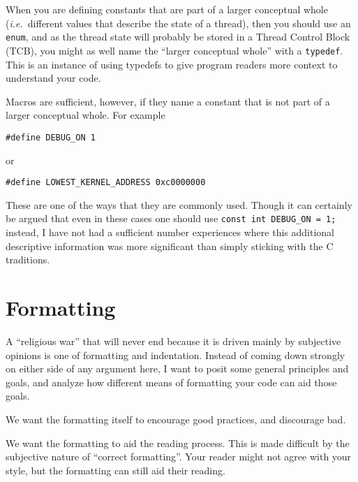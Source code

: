 \documentclass[11pt,onecolumn]{article}
\def\ie{\textit{i.e.}}
\newcommand{\head}[1]{\vspace{0.4em}\noindent{\bf #1}}
\begin{document}
When you are defining constants that are part of a larger conceptual
whole (\ie\ different values that describe the state of a thread),
then you should use an {\tt enum}, and as the thread state will
probably be stored in a Thread Control Block (TCB), you might as well
name the ``larger conceptual whole'' with a {\tt typedef}.  This is an
instance of using typedefs to give program readers more context to
understand your code.

Macros are sufficient, however, if they name a constant that is not
part of a larger conceptual whole.  For example

    \begin{minipage}{3in}
      \footnotesize
      \lstset{language=C}
      \begin{lstlisting}
#define DEBUG_ON 1
      \end{lstlisting}
    \end{minipage}

or

    \begin{minipage}{3in}
      \footnotesize
      \lstset{language=C}
      \begin{lstlisting}
#define LOWEST_KERNEL_ADDRESS 0xc0000000        
      \end{lstlisting}
    \end{minipage}

These are one of the ways that they are commonly used.  Though it can
certainly be argued that even in these cases one should use {\tt const
  int DEBUG\_ON = 1;} instead, I have not had a sufficient number
experiences where this additional descriptive information was more
significant than simply sticking with the C traditions.

\section{Formatting}
\label{s:formatting}

A ``religious war'' that will never end because it is driven mainly by
subjective opinions is one of formatting and indentation.  Instead of
coming down strongly on either side of any argument here, I want to
posit some general principles and goals, and analyze how different
means of formatting your code can aid those goals.

\head{Goal 1.} We want the formatting itself to encourage good
practices, and discourage bad.

\head{Goal 2.} We want the formatting to aid the reading process.
This is made difficult by the subjective nature of ``correct
formatting''.  Your reader might not agree with your style, but the
formatting can still aid their reading.
\end{document}
